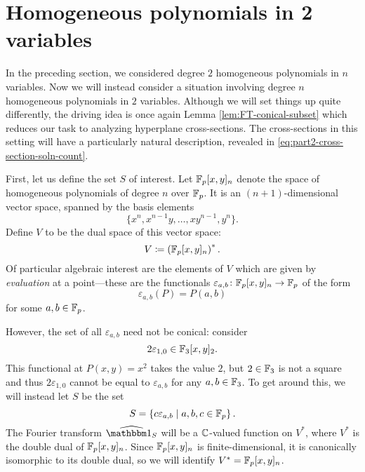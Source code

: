 \section{Homogeneous polynomials in 2 variables}\label{sec:part2}
In the preceding section, we considered degree $2$ homogeneous polynomials in $n$ variables. Now we will instead consider a situation involving degree $n$ homogeneous polynomials in $2$ variables. Although we will set things up quite differently, the driving idea is once again Lemma \ref{lem:FT-conical-subset} which reduces our task to analyzing hyperplane cross-sections. The cross-sections in this setting will have a particularly natural description, revealed in \eqref{eq:part2-cross-section-soln-count}.

First, let us define the set $S$ of interest. Let $\mathbb{F}_p[x,y]_n$ denote the space of homogeneous polynomials of degree $n$ over $\mathbb{F}_p$. It is an $(n+1)$-dimensional vector space, spanned by the basis elements
\[
	\{x^n, x^{n-1}y, \ldots, xy^{n-1}, y^n\}.
\]
Define $V$ to be the dual space of this vector space:
\[
	V \coloneqq \left(\mathbb{F}_p[x,y]_n\right)^*.
\]
Of particular algebraic interest are the elements of $V$ which are given by \emph{evaluation} at a point---these are the functionals $\varepsilon_{a,b}\colon \mathbb{F}_p[x,y]_n \to \mathbb{F}_p$ of the form
\[
	\varepsilon_{a,b}(P) = P(a,b) 
\]
for some $a,b\in \mathbb{F}_p$.

However, the set of all $\varepsilon_{a,b}$ need not be conical: consider
\[
	2\varepsilon_{1,0} \in \mathbb{F}_3[x,y]_2.
\]
This functional at $P(x,y) = x^2$ takes the value $2$, but $2\in \mathbb{F}_3$ is not a square and thus $2\varepsilon_{1,0}$ cannot be equal to $\varepsilon_{a,b}$ for any $a,b\in \mathbb{F}_3$. To get around this, we will instead let $S$ be the set
\begin{equation}\label{eq:part2-defn-S}
	S=\left\{c\varepsilon_{a,b} \mid a,b,c \in \mathbb{F}_p\right\}.
\end{equation}
The Fourier transform $\widehat{\IND_S}$ will be a $\mathbb{C}$-valued function on $V^*$, where $V^*$ is the double dual of $\mathbb{F}_p[x,y]_n$. Since $\mathbb{F}_p[x,y]_n$ is finite-dimensional, it is canonically isomorphic to its double dual, so we will identify $V^* = \mathbb{F}_p[x,y]_n$.

